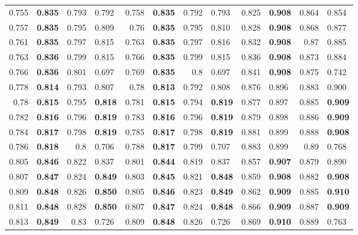 \begin{tabular}{rlrlrlrlrlrl}
\toprule
 0.755 & \bfseries 0.835 & 0.793 & 0.792       & 0.758 & \bfseries 0.835 & 0.792 & 0.793       & 0.825 & \bfseries 0.908 & 0.864 & 0.854       \\
 0.757 & \bfseries 0.835 & 0.795 & 0.809       & 0.76  & \bfseries 0.835 & 0.795 & 0.810       & 0.828 & \bfseries 0.908 & 0.868 & 0.877       \\
 0.761 & \bfseries 0.835 & 0.797 & 0.815       & 0.763 & \bfseries 0.835 & 0.797 & 0.816       & 0.832 & \bfseries 0.908 & 0.87  & 0.885       \\
 0.763 & \bfseries 0.836 & 0.799 & 0.815       & 0.766 & \bfseries 0.835 & 0.799 & 0.815       & 0.836 & \bfseries 0.908 & 0.873 & 0.884       \\
 0.766 & \bfseries 0.836 & 0.801 & 0.697       & 0.769 & \bfseries 0.835 & 0.8   & 0.697       & 0.841 & \bfseries 0.908 & 0.875 & 0.742       \\
 0.778 & \bfseries 0.814 & 0.793 & 0.807       & 0.78  & \bfseries 0.813 & 0.792 & 0.808       & 0.876 & 0.896       & 0.883 & 0.900       \\
 0.78  & \bfseries 0.815 & 0.795 & \bfseries 0.818 & 0.781 & \bfseries 0.815 & 0.794 & \bfseries 0.819 & 0.877 & 0.897       & 0.885 & \bfseries 0.909 \\
 0.782 & \bfseries 0.816 & 0.796 & \bfseries 0.819 & 0.783 & \bfseries 0.816 & 0.796 & \bfseries 0.819 & 0.879 & 0.898       & 0.886 & \bfseries 0.909 \\
 0.784 & \bfseries 0.817 & 0.798 & \bfseries 0.819 & 0.785 & \bfseries 0.817 & 0.798 & \bfseries 0.819 & 0.881 & 0.899       & 0.888 & \bfseries 0.908 \\
 0.786 & \bfseries 0.818 & 0.8   & 0.706       & 0.788 & \bfseries 0.817 & 0.799 & 0.707       & 0.883 & 0.899       & 0.89  & 0.768       \\
 0.805 & \bfseries 0.846 & 0.822 & 0.837       & 0.801 & \bfseries 0.844 & 0.819 & 0.837       & 0.857 & \bfseries 0.907 & 0.879 & 0.890       \\
 0.807 & \bfseries 0.847 & 0.824 & \bfseries 0.849 & 0.803 & \bfseries 0.845 & 0.821 & \bfseries 0.848 & 0.859 & \bfseries 0.908 & 0.882 & \bfseries 0.908 \\
 0.809 & \bfseries 0.848 & 0.826 & \bfseries 0.850 & 0.805 & \bfseries 0.846 & 0.823 & \bfseries 0.849 & 0.862 & \bfseries 0.909 & 0.885 & \bfseries 0.910 \\
 0.811 & \bfseries 0.848 & 0.828 & \bfseries 0.850 & 0.807 & \bfseries 0.847 & 0.824 & \bfseries 0.848 & 0.866 & \bfseries 0.909 & 0.887 & \bfseries 0.909 \\
 0.813 & \bfseries 0.849 & 0.83  & 0.726       & 0.809 & \bfseries 0.848 & 0.826 & 0.726       & 0.869 & \bfseries 0.910 & 0.889 & 0.763       \\
\bottomrule
\end{tabular}